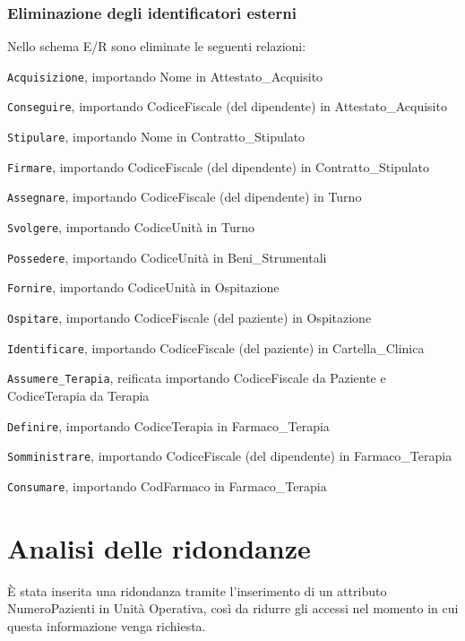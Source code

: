 \documentclass[a4paper, 12pt]{report}
\newenvironment{packed_itemize}{
\begin{itemize}
        \setlength{\itemsep}{1pt}
        \setlength{\parskip}{0pt}
        \setlength{\parsep}{0pt}
}{\end{itemize}}
\begin{document}
\subsubsection*{Eliminazione degli identificatori esterni}
Nello schema E/R sono eliminate le seguenti relazioni:
\begin{packed_itemize}
        \item \texttt{Acquisizione}, importando Nome in Attestato\_Acquisito
        \item \texttt{Conseguire}, importando CodiceFiscale (del dipendente) in Attestato\_Acquisito
        \item \texttt{Stipulare}, importando Nome in Contratto\_Stipulato
        \item \texttt{Firmare}, importando CodiceFiscale (del dipendente) in Contratto\_Stipulato
        \item \texttt{Assegnare}, importando CodiceFiscale (del dipendente) in Turno
        \item \texttt{Svolgere}, importando CodiceUnità in Turno
        \item \texttt{Possedere}, importando CodiceUnità in Beni\_Strumentali
        \item \texttt{Fornire}, importando CodiceUnità in Ospitazione
        \item \texttt{Ospitare}, importando CodiceFiscale (del paziente) in Ospitazione
        \item \texttt{Identificare}, importando CodiceFiscale (del paziente) in Cartella\_Clinica
        \item \texttt{Assumere\_Terapia}, reificata importando CodiceFiscale da Paziente e CodiceTerapia da Terapia
        \item \texttt{Definire}, importando CodiceTerapia in Farmaco\_Terapia
        \item \texttt{Somministrare}, importando CodiceFiscale (del dipendente) in Farmaco\_Terapia
        \item \texttt{Consumare}, importando CodFarmaco in Farmaco\_Terapia
\end{packed_itemize}

\newpage
\section{Analisi delle ridondanze}
È stata inserita una ridondanza tramite l'inserimento di un attributo NumeroPazienti in Unità Operativa, così da ridurre gli accessi
nel momento in cui questa informazione venga richiesta.
\end{document}
